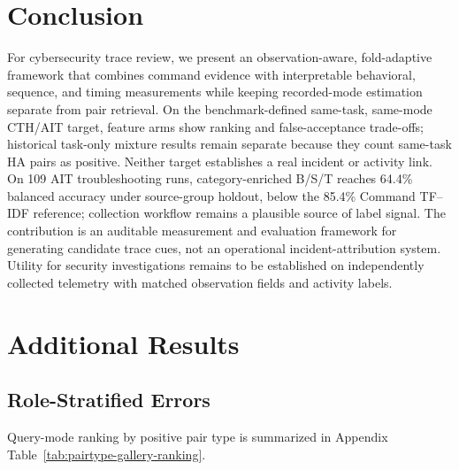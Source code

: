 \documentclass[10pt]{article}
\begin{document}
\section{Conclusion}
For cybersecurity trace review, we present an observation-aware, fold-adaptive framework that combines command evidence with interpretable behavioral, sequence, and timing measurements while keeping recorded-mode estimation separate from pair retrieval. On the benchmark-defined same-task, same-mode CTH/AIT target, feature arms show ranking and false-acceptance trade-offs; historical task-only mixture results remain separate because they count same-task HA pairs as positive. Neither target establishes a real incident or activity link. On 109 AIT troubleshooting runs, category-enriched B/S/T reaches 64.4\% balanced accuracy under source-group holdout, below the 85.4\% Command TF--IDF reference; collection workflow remains a plausible source of label signal. The contribution is an auditable measurement and evaluation framework for generating candidate trace cues, not an operational incident-attribution system. Utility for security investigations remains to be established on independently collected telemetry with matched observation fields and activity labels.

\clearpage
\appendix
\renewcommand{\thefigure}{S\arabic{figure}}
\setcounter{figure}{0}
\section{Additional Results}
\label{app:additional-results}

\subsection{Role-Stratified Errors}
Query-mode ranking by positive pair type is summarized in Appendix Table~\ref{tab:pairtype-gallery-ranking}.
\end{document}
